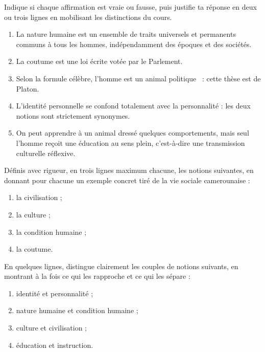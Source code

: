 \documentclass[11pt]{article}
\newcommand{\cle}[1]{{\popxbold\color{popdark}#1}}
\begin{document}
\begin{exercice}
Indique si chaque affirmation est vraie ou fausse, puis justifie ta réponse en deux ou trois lignes en mobilisant les distinctions du cours.

\begin{enumerate}
\item La nature humaine est un ensemble de traits universels et permanents communs à tous les hommes, indépendamment des époques et des sociétés.
\item La coutume est une loi écrite votée par le Parlement.
\item Selon la formule célèbre, \guillemotleft l'homme est un animal politique \guillemotright\ : cette thèse est de Platon.
\item L'identité personnelle se confond totalement avec la personnalité : les deux notions sont strictement synonymes.
\item On peut apprendre à un animal dressé quelques comportements, mais seul l'homme reçoit une éducation au sens plein, c'est-à-dire une transmission culturelle réflexive.
\end{enumerate}
\end{exercice}

\begin{exercice}[Définitions]
Définis avec rigueur, en trois lignes maximum chacune, les notions suivantes, en donnant pour chacune un exemple concret tiré de la vie sociale camerounaise :
\begin{enumerate}
\item la \cle{civilisation} ;
\item la \cle{culture} ;
\item la \cle{condition humaine} ;
\item la \cle{coutume}.
\end{enumerate}
\end{exercice}

\begin{exercice}
En quelques lignes, distingue clairement les couples de notions suivants, en montrant à la fois ce qui les rapproche et ce qui les sépare :
\begin{enumerate}
\item \cle{identité} et \cle{personnalité} ;
\item \cle{nature humaine} et \cle{condition humaine} ;
\item \cle{culture} et \cle{civilisation} ;
\item \cle{éducation} et \cle{instruction}.
\end{enumerate}
\end{exercice}
\end{document}
